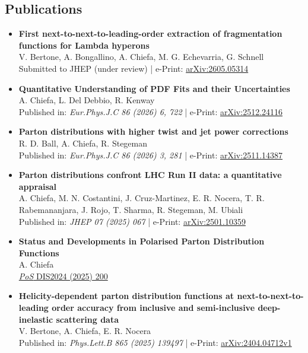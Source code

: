 \documentclass[10pt,a4paper]{article}
\begin{document}
\subsection*{Publications}
\begin{itemize}[leftmargin=1em]
    \item[]
      \textbf{First next-to-next-to-leading-order extraction of fragmentation functions for Lambda hyperons} \\
      V. Bertone, A. Bongallino, A. Chiefa, M. G. Echevarria, G. Schnell \\
      Submitted to JHEP (under review) | e-Print: \href{https://arxiv.org/abs/2605.05314}{arXiv:2605.05314}
    \item[]
      \textbf{Quantitative Understanding of PDF Fits and their Uncertainties} \\
      A. Chiefa, L. Del Debbio, R. Kenway \\
      Published in: {\it Eur.Phys.J.C 86 (2026) 6, 722} | e-Print: \href{https://arxiv.org/abs/2512.24116}{arXiv:2512.24116}
    \item[] 
      \textbf{Parton distributions with higher twist and jet power corrections} \\
      R. D. Ball, A. Chiefa, R. Stegeman \\
      Published in: {\it Eur.Phys.J.C 86 (2026) 3, 281} | e-Print: \href{https://arxiv.org/abs/2511.14387}{arXiv:2511.14387}
    \item[] 
      \textbf{Parton distributions confront LHC Run II data: a quantitative appraisal} \\
      A. Chiefa, M. N. Costantini, J. Cruz-Martinez, E. R. Nocera, T. R. Rabemananjara, J. Rojo, T. Sharma, R. Stegeman, M. Ubiali \\
      Published in: {\it JHEP 07 (2025) 067} | e-Print: \href{https://arxiv.org/abs/2501.10359}{arXiv:2501.10359}
    \item[] 
      \textbf{Status and Developments in Polarised Parton Distribution Functions} \\
      A. Chiefa\\
      \href{https://pos.sissa.it/469/200/pdf}{\textit{PoS} DIS2024 (2025) 200}
    \item[]
      \textbf{Helicity-dependent parton distribution functions at next-to-next-to-leading order accuracy from inclusive and semi-inclusive deep-inelastic scattering data} \\
      V. Bertone, A. Chiefa, E. R. Nocera \\
      Published in: {\it Phys.Lett.B 865 (2025) 139497} | e-Print: \href{https://arxiv.org/pdf/2404.04712}{arXiv:2404.04712v1}
\end{itemize}
\end{document}

